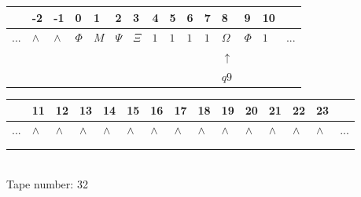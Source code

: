\documentclass[11pt]{article}
\begin{document}
\begin{table}[H]
\centering
\begin{tabular}{lllllllllllllll}
 & -2 & -1 & 0 & 1 & 2 & 3 & 4 & 5 & 6 & 7 & 8 & 9 & 10 & \\
\hline
$...$ & \multicolumn{1}{|l|}{$\wedge$} & \multicolumn{1}{|l|}{$\wedge$} & \multicolumn{1}{|l|}{$\Phi$} & \multicolumn{1}{|l|}{$M$} & \multicolumn{1}{|l|}{$\Psi$} & \multicolumn{1}{|l|}{$\Xi$} & \multicolumn{1}{|l|}{$1$} & \multicolumn{1}{|l|}{$1$} & \multicolumn{1}{|l|}{$1$} & \multicolumn{1}{|l|}{$1$} & \multicolumn{1}{|l|}{$\Omega$} & \multicolumn{1}{|l|}{$\Phi$} & \multicolumn{1}{|l|}{$1$} & $...$\\
\hline
&  &  &  &  &  &  &  &  &  &  & $\uparrow$ &  &  &  \\
&  &  &  &  &  &  &  &  &  &  & $ q9 $ &  &  &  \\
\end{tabular}
\begin{tabular}{lllllllllllllll}
 & 11 & 12 & 13 & 14 & 15 & 16 & 17 & 18 & 19 & 20 & 21 & 22 & 23 & \\
\hline
$...$ & \multicolumn{1}{|l|}{$\wedge$} & \multicolumn{1}{|l|}{$\wedge$} & \multicolumn{1}{|l|}{$\wedge$} & \multicolumn{1}{|l|}{$\wedge$} & \multicolumn{1}{|l|}{$\wedge$} & \multicolumn{1}{|l|}{$\wedge$} & \multicolumn{1}{|l|}{$\wedge$} & \multicolumn{1}{|l|}{$\wedge$} & \multicolumn{1}{|l|}{$\wedge$} & \multicolumn{1}{|l|}{$\wedge$} & \multicolumn{1}{|l|}{$\wedge$} & \multicolumn{1}{|l|}{$\wedge$} & \multicolumn{1}{|l|}{$\wedge$} & $...$\\
\hline
&  &  &  &  &  &  &  &  &  &  &  &  &  &  \\
&  &  &  &  &  &  &  &  &  &  &  &  &  &  \\
\end{tabular}
\\
Tape number: 32
\noindent\makebox[\linewidth]{\hdashrule{\textwidth}{1pt}{1pt}}\end{table}
\end{document}
